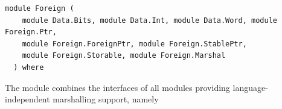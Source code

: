 \label{module:Foreign}
\haddockbeginheader
{\haddockverb\begin{verbatim}
module Foreign (
    module Data.Bits, module Data.Int, module Data.Word, module Foreign.Ptr,
    module Foreign.ForeignPtr, module Foreign.StablePtr,
    module Foreign.Storable, module Foreign.Marshal
  ) where\end{verbatim}}
\haddockendheader

The module  combines the interfaces of all modules providing
 language-independent marshalling support, namely\par
\begin{haddockdesc}
\item[\begin{tabular}{@{}l}
module Data.Bits\\module Data.Int\\module Data.Word\\module Foreign.Ptr\\module Foreign.ForeignPtr\\module Foreign.StablePtr\\module Foreign.Storable\\module Foreign.Marshal
\end{tabular}]
\end{haddockdesc}